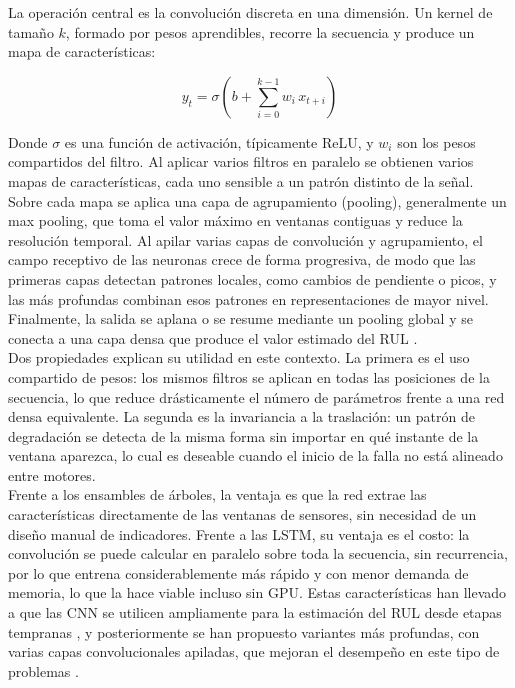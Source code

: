 La operación central es la convolución discreta en una dimensión. Un kernel de tamaño $k$, formado por pesos aprendibles, recorre la secuencia y produce un mapa de características:

\[
y_t = \sigma\left( b + \sum_{i=0}^{k-1} w_i \, x_{t+i} \right)
\]

Donde $\sigma$ es una función de activación, típicamente ReLU, y $w_i$ son los pesos compartidos del filtro. Al aplicar varios filtros en paralelo se obtienen varios mapas de características, cada uno sensible a un patrón distinto de la señal.\\[.15cm]

Sobre cada mapa se aplica una capa de agrupamiento (pooling), generalmente un max pooling, que toma el valor máximo en ventanas contiguas y reduce la resolución temporal. Al apilar varias capas de convolución y agrupamiento, el campo receptivo de las neuronas crece de forma progresiva, de modo que las primeras capas detectan patrones locales, como cambios de pendiente o picos, y las más profundas combinan esos patrones en representaciones de mayor nivel. Finalmente, la salida se aplana o se resume mediante un pooling global y se conecta a una capa densa que produce el valor estimado del RUL \cite{cerqueira2024}.\\[.15cm]

Dos propiedades explican su utilidad en este contexto. La primera es el uso compartido de pesos: los mismos filtros se aplican en todas las posiciones de la secuencia, lo que reduce drásticamente el número de parámetros frente a una red densa equivalente. La segunda es la invariancia a la traslación: un patrón de degradación se detecta de la misma forma sin importar en qué instante de la ventana aparezca, lo cual es deseable cuando el inicio de la falla no está alineado entre motores.\\[.15cm]

Frente a los ensambles de árboles, la ventaja es que la red extrae las características directamente de las ventanas de sensores, sin necesidad de un diseño manual de indicadores. Frente a las LSTM, su ventaja es el costo: la convolución se puede calcular en paralelo sobre toda la secuencia, sin recurrencia, por lo que entrena considerablemente más rápido y con menor demanda de memoria, lo que la hace viable incluso sin GPU. Estas características han llevado a que las CNN se utilicen ampliamente para la estimación del RUL desde etapas tempranas \cite{babu2016}, y posteriormente se han propuesto variantes más profundas, con varias capas convolucionales apiladas, que mejoran el desempeño en este tipo de problemas \cite{li2018cnn}.\\[.15cm]

